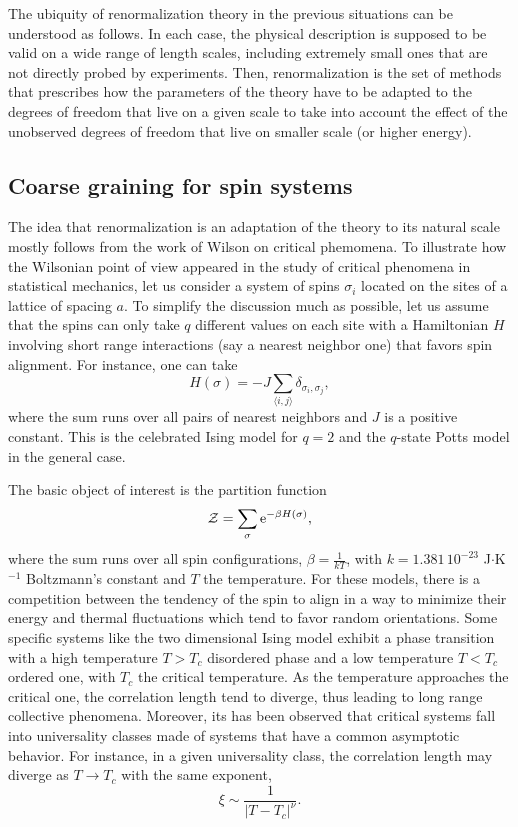 \documentclass[12pt,here,feynmf]{article}
\begin{document}
The ubiquity of renormalization theory  in the previous situations can be understood as follows. In each case, the physical description is supposed to be valid on a wide range of length scales, including extremely small ones that are not directly probed by experiments. Then, renormalization is the set of methods that prescribes how the parameters of the theory have to be adapted to the degrees of freedom that live on a given scale to take into account the effect of the unobserved degrees of freedom that live on smaller scale (or higher energy).  


\subsection{Coarse graining for spin systems}

The idea that renormalization is an adaptation of the theory to its natural scale mostly follows from the work of Wilson on critical phemomena. To illustrate how the Wilsonian point of view appeared in the study of critical phenomena in statistical mechanics, let us consider a system of spins ${\sigma_{i}}$  located on the sites of a lattice of spacing $a$. To simplify the discussion much as possible, let us assume that the spins can only take  $q$ different values on each site with a Hamiltonian $H$ involving short range interactions (say a nearest   neighbor one) that favors spin alignment. For instance, one can take
\begin{equation}
H(\sigma)=-J\sum_{\langle i,j\rangle}\delta_{\sigma_{i},\sigma_{j}},
\end{equation}
where the sum runs over all pairs of nearest  neighbors and $J$ is a positive constant. This is the celebrated Ising model for $q=2$ and the $q$-state Potts model in the general case.

The basic object of interest is the partition function
 \begin{equation}
{\cal Z}=\mathop{\sum}\limits_{\sigma}\mathrm{e}^{-\beta H(\sigma)},\label{partition}
\end{equation}
where the sum runs over all spin configurations, $\beta=\frac{1}{kT}$, with $k=1.381\,10^{-23}$ J$\cdot$K$^{-1}$ Boltzmann's constant and $T$ the temperature. For these models,   there is a competition between the tendency of the spin to align in a way to minimize their energy and thermal fluctuations which tend to favor random orientations. Some specific systems like the two dimensional Ising model exhibit a phase transition with a high temperature $T>T_{c}$ disordered phase and a low temperature $T<T_{c}$ ordered one, with $T_{c}$ the critical temperature. As the temperature approaches the critical one, the correlation length tend to diverge, thus leading to long range collective phenomena. Moreover, its has been observed that critical systems fall into universality classes made of systems that have a common asymptotic behavior. For instance, in a given universality class, the correlation length may diverge as $T\rightarrow T_{c}$ with the same exponent,
\begin{equation}
\xi\sim\frac{1}{|T-T_{c}|^{\nu}}.
\end{equation}
\end{document}
